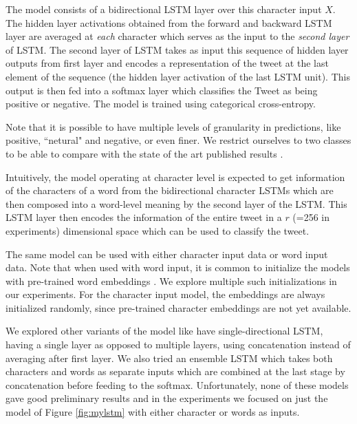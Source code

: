 \documentclass{article} %
\begin{document}
The model consists of a bidirectional LSTM layer over this character input $X$. The hidden layer activations obtained from the forward and backward LSTM layer are averaged at {\it each} character which serves as the input to the {\it second layer} of LSTM. The second layer of LSTM takes as input this sequence of hidden layer outputs from first layer and encodes a representation of the tweet at the last element of the sequence (the hidden layer activation of the last LSTM unit). This output is then fed into a softmax layer which classifies the Tweet as being positive or negative.
The model is trained using categorical cross-entropy.

Note that it is possible to have multiple levels of granularity in predictions, like positive, ``netural" and negative, or even finer.
We restrict ourselves to two classes to be able to compare with the state of the art published results \cite{kalchbrenner2014convolutional}.

Intuitively, the model operating at character level is expected to get information of the characters of a word from the bidirectional character LSTMs which are then composed into a word-level meaning by the second layer of the LSTM. This LSTM layer then encodes the information of the entire tweet in a $r$ (=256 in experiments) dimensional space which can be used to classify the tweet.

The same model can be used with either character input data or word input data. Note that when used with word input, it is common to initialize the models with pre-trained word embeddings \cite{mikolov2013distributed}. We explore multiple such initializations in our experiments.
For the character input model, the embeddings are always initialized randomly, since pre-trained character embeddings are not yet available.

We explored other variants of the model like have single-directional LSTM, having a single layer as opposed to multiple layers, using concatenation instead of averaging after first layer. We also tried an ensemble LSTM which takes both characters and words as separate inputs which are combined at the last stage by concatenation before feeding to the softmax. Unfortunately, none of these models gave good preliminary results and in the experiments we focused on just the model of Figure \ref{fig:mylstm} with either character or words as inputs.
\end{document}
